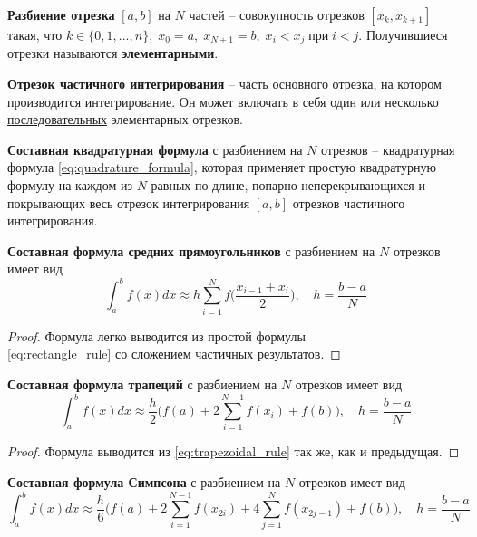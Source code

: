 \documentclass[../main.tex]{subfile}
\begin{document}
\begin{define}
	\textbf{Разбиение отрезка} $[a,b]$ на $N$ частей -- совокупность
	отрезков $[x_k,x_{k+1}]$ такая, что $k\in\{0,1,...,n\},\;x_0=a,\;x_{N+1}
	=b,\;x_i<x_j\;\text{при}\;i<j$. Получившиеся отрезки называются
	\textbf{элементарными}.
\end{define}

\begin{define}
	\textbf{Отрезок частичного интегрирования} -- часть основного отрезка,
	на котором производится интегрирование. Он может включать в себя один
	или несколько \underline{последовательных} элементарных отрезков.
\end{define}

\begin{define}
	\textbf{Составная квадратурная формула} с разбиением на $N$ отрезков --
	квадратурная формула \eqref{eq:quadrature_formula}, которая применяет
	простую квадратурную формулу на каждом из $N$ равных по длине, попарно
	неперекрывающихся и покрывающих весь отрезок интегрирования $[a,b]$
	отрезков частичного интегрирования.
\end{define}
\newpage

\begin{theorem}
	\textbf{Составная формула средних прямоугольников} с разбиением на $N$
	отрезков имеет вид
	\[\boxed{\int_a^b f(x)dx\approx h\sum_{i=1}^{N}f\Big(\frac{x_{i-1}+x_i}
	{2}\Big),\quad h=\frac{b-a}{N}}\]
\end{theorem}

\begin{proof}
	Формула легко выводится из простой формулы \\
	\eqref{eq:rectangle_rule} со сложением частичных результатов.
\end{proof}

\begin{theorem}
	\textbf{Составная формула трапеций} с разбиением на $N$ отрезков имеет вид
	\[\boxed{\int_a^b f(x)dx\approx \frac{h}{2}\Big(f(a)+2\sum_{i=1}^{N-1}
	f(x_i)+f(b)\Big),\quad h=\frac{b-a}{N}}\]
\end{theorem}

\begin{proof}
	Формула выводится из \eqref{eq:trapezoidal_rule} так же, как и
	предыдущая.
\end{proof}

\begin{theorem}
	\textbf{Составная формула Симпсона} с разбиением на $N$ отрезков имеет вид
	\[\boxed{\int_a^b f(x)dx\approx \frac{h}{6}\Big(f(a)+2\sum_{i=1}^{N-1}
	f(x_{2i})+4\sum_{j=1}^{N}f(x_{2j-1})+f(b)\Big),\quad h=\frac{b-a}{N}}\]
\end{theorem}
\end{document}
